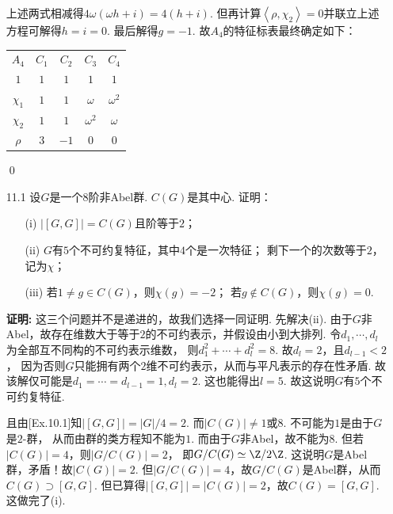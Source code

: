 \begin{enumerate}
    上述两式相减得$4\omega(\omega h + i) = 4(h + i)$.
    但再计算$\left<\rho,\chi_{2}\right>=0$并联立上述方程可解得$h=i=0$.
    最后解得$g=-1$. 故$A_{4}$的特征标表最终确定如下：
    \begin{center}
    \begin{tabular}{|c|c|c|c|c|}
        $A_{4}$ & $C_{1}$ & $C_{2}$ & $C_{3}$ & $C_{4}$ \\ 
        $1$ & $1$ & $1$ & $1$ & $1$  \\ 
        $\chi_{1}$ & $1$ & $1$ & $\omega$ & $\omega^{2}$  \\ 
        $\chi_{2}$ & $1$ & $1$ & $\omega^{2}$ & $\omega$  \\ 
        $\rho$ & $3$ & $-1$ & $0$ & $0$
    \end{tabular}
    \end{center}    
    \qed

        \item[11.1] 设$G$是一个$8$阶非Abel群. $C(G)$是其中心. 证明：
        \begin{itemize}
            \item[(i)] $|[G,G]|=C(G)$且阶等于$2$；
            \item[(ii)] $G$有$5$个不可约复特征，其中$4$个是一次特征；
            剩下一个的次数等于$2$，记为$\chi$；
            \item[(iii)] 若$1 \neq g \in C(G)$，则$\chi(g)=-2$；
            若$g \notin C(G)$，则$\chi(g)=0$.
        \end{itemize}
        \item[\textbf{证明:}]
        这三个问题并不是递进的，故我们选择一同证明.
        先解决(ii). 由于$G$非Abel，故存在维数大于等于$2$的不可约表示，并假设由小到大排列.
        令$d_{1},\cdots,d_{l}$为全部互不同构的不可约表示维数，
        则$d_{1}^{2} + \cdots + d_{l}^{2}=8$. 故$d_{l}=2$，且$d_{l-1} <2$，
        因为否则$G$只能拥有两个$2$维不可约表示，从而与平凡表示的存在性矛盾.
        故该解仅可能是$d_{1}=\cdots=d_{l-1}=1,d_{l}=2$. 这也能得出$l=5$.
        故这说明$G$有$5$个不可约复特征. 
        
        且由[Ex.10.1]知$|[G,G]|=|G|/4=2$.
        而$|C(G)| \neq 1$或$8$. 不可能为$1$是由于$G$是$2$-群，
        从而由群的类方程知不能为$1$.
        而由于$G$非Abel，故不能为$8$. 但若$|C(G)|=4$，则$|G/C(G)|=2$，
        即$G/C(G) \simeq \Z/2\Z$. 这说明$G$是Abel群，矛盾！故$|C(G)|=2$.
        但$|G/C(G)|=4$，故$G/C(G)$是Abel群，从而$C(G) \supset [G,G]$. 
        但已算得$|[G,G]|=|C(G)|=2$，故$C(G)=[G,G]$. 这做完了(i).


\end{enumerate}
